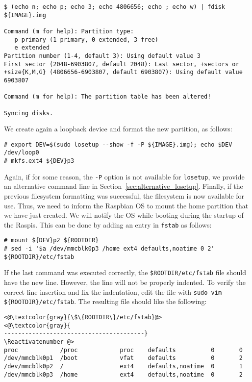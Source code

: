 \begin{lstlisting}[]
$ (echo n; echo p; echo 3; echo 4806656; echo ; echo w) | fdisk ${IMAGE}.img

Command (m for help): Partition type:
   p primary (1 primary, 0 extended, 3 free)
   e extended
Partition number (1-4, default 3): Using default value 3
First sector (2048-6903807, default 2048): Last sector, +sectors or
+size{K,M,G} (4806656-6903807, default 6903807): Using default value 6903807

Command (m for help): The partition table has been altered!

Syncing disks.
\end{lstlisting}
\FloatBarrier
\vspace{-5mm}

We create again a loopback device and format the new partition, as follows:
\begin{lstlisting}[]
# export DEV=$(sudo losetup --show -f -P ${IMAGE}.img); echo $DEV
/dev/loop0
# mkfs.ext4 ${DEV}p3
\end{lstlisting}
\FloatBarrier
\vspace{-5mm}

Again, if for some reason, the \texttt{-P} option is not available for
\texttt{losetup}, we provide an alternative command line in
Section~\ref{sec:alternative_losetup}. Finally, if the previous filesystem
formatting was successful, the filesystem is now available for use. Thus,
we need to inform the Raspbian \ac{OS} to mount the home partition
that we have just created. We will notify the \ac{OS} while
booting during the startup of the \ac{Raspi}s. This can be done by adding
an entry in \texttt{fstab} as follows:

\begin{lstlisting}[]
# mount ${DEV}p2 ${ROOTDIR}
# sed -i '$a /dev/mmcblk0p3 /home ext4 defaults,noatime 0 2' ${ROOTDIR}/etc/fstab
\end{lstlisting}
\FloatBarrier
\vspace{-5mm}

If the last command was executed correctly, the
\texttt{\${ROOTDIR}/etc/fstab} file should have the new line. However,
the line will not be properly indented. To verify the correct line
insertion and fix the indentation, edit the file with
\texttt{sudo vim \$\{ROOTDIR\}/etc/fstab}. The resulting file should like
the following:

\begin{lstlisting}[]
<@\textcolor{gray}{\$\{ROOTDIR\}/etc/fstab}@>
<@\textcolor{gray}{
----------------------------------------}
\Reactivatenumber @>
proc            /proc            proc    defaults          0       0
/dev/mmcblk0p1  /boot            vfat    defaults          0       2
/dev/mmcblk0p2  /                ext4    defaults,noatime  0       1
/dev/mmcblk0p3  /home            ext4    defaults,noatime  0       2
\end{lstlisting}
\FloatBarrier
\vspace{-5mm}


